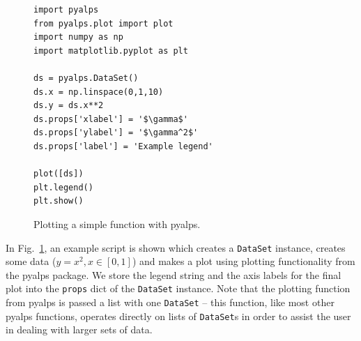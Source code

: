 \documentclass[12pt]{iopart}
\begin{document}
\begin{figure}
\begin{lstlisting}
import pyalps
from pyalps.plot import plot
import numpy as np
import matplotlib.pyplot as plt

ds = pyalps.DataSet()
ds.x = np.linspace(0,1,10)
ds.y = ds.x**2
ds.props['xlabel'] = '$\gamma$'
ds.props['ylabel'] = '$\gamma^2$'
ds.props['label'] = 'Example legend'

plot([ds])
plt.legend()
plt.show()
\end{lstlisting}
\caption{Plotting a simple function with pyalps.}
\label{fig:plotting}
\end{figure}

In Fig.~\ref{fig:plotting}, an example script is shown which creates a {\tt DataSet} instance, creates some data ($y = x^2, x \in [0,1]$) and makes a plot using plotting functionality from the pyalps package. We store the legend string and the axis labels for the final plot into the {\tt props} dict of the {\tt DataSet} instance. Note that the plotting function from pyalps is passed a list with one {\tt DataSet} -- this function, like most other pyalps functions, operates directly on lists of {\tt DataSet}s in order to assist the user in dealing with larger sets of data.

\end{document}
